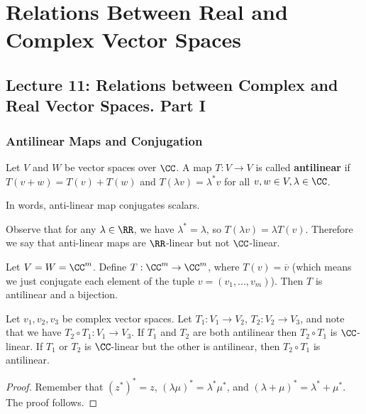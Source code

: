 \section{Relations Between Real and Complex Vector Spaces}
\subsection{Lecture 11: Relations between Complex and Real Vector Spaces. Part I}
\subsubsection{Antilinear Maps and Conjugation}

\begin{defn}[Antilinear]
Let $V$ and $W$ be vector spaces over $\CC$. A map $T : V \to V$ is called \textbf{antilinear} if $T(v+w)=T(v)+T(w)$ and $T(\lambda v) = \lambda^* v$ for all $v,w\in V, \lambda\in \CC$.
\end{defn}
\begin{remark*}
In words, anti-linear map conjugates scalars.
\end{remark*}

\begin{remark*}
    Observe that for any $\lambda \in \RR$, we have $\lambda^* = \lambda$, so $T(\lambda v) = \lambda T(v)$. Therefore we say that anti-linear maps are $\RR$-linear but not $\CC$-linear.
\end{remark*}

\begin{example}
Let $V=W=\CC^m$. Define $T : \CC^m \to \CC^m$, where $T(v) = \overline{v}$ (which means we just conjugate each element of the tuple $v = (v_1,...,v_m)$). Then $T$ is antilinear and a bijection.
\end{example}

\begin{lemma}
Let $v_1,v_2,v_3$ be complex vector spaces. Let $T_1 : V_1 \to V_2$, $T_2:V_2\to V_3$, and note that we have $T_2\circ T_1:V_1\to V_3$. If $T_1$ and $T_2$ are both antilinear then $T_2\circ T_1$ is $\CC$-linear. If $T_1$ or $T_2$ is $\CC$-linear but the other is antilinear, then $T_2\circ T_1$ is antilinear.
\end{lemma}

\begin{proof}
Remember that $(z^*)^*=z$, $(\lambda\mu)^*=\lambda^*\mu^*$, and $(\lambda+\mu)^*=\lambda^*+\mu^*$. The proof follows.
\end{proof}


